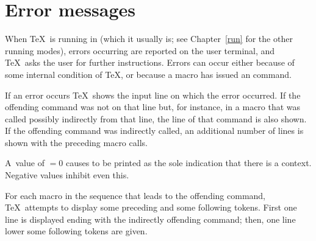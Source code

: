 \section{Error messages}

When \TeX\ is running in  (which it usually is;
see Chapter~\ref{run} for the other running modes),
errors occurring are reported on the user terminal, and \TeX\
asks the user for further instructions.
Errors can occur either because of some internal condition
of \TeX, or because a macro has issued an 
command.

If an error occurs \TeX\ shows the input 
line 
on which the error occurred. If the offending command was
not on that line but, for instance, in a macro that was
called \ldash possibly indirectly \rdash  from that line,
the line of that command is also shown.
If the offending command was indirectly called,
an additional  number of lines
is shown with the preceding macro calls.

A~value of ${}=0$ causes 
to be printed as the sole indication that there is a context.
Negative values inhibit even this.

For each macro in the sequence that leads to the offending
command,
\TeX\ attempts to display some
preceding and some following tokens.
First one line is displayed ending with
the \ldash indirectly \rdash  offending command; then, one line lower
some following tokens are given. 


